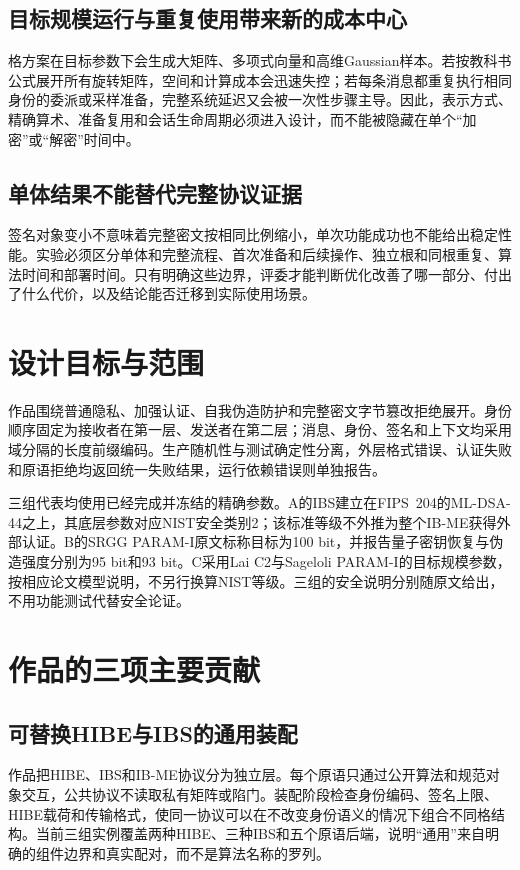\documentclass[UTF8,a4paper,12pt,oneside,openany,fontset=fandol]{ctexrep}
\begin{document}
\subsection{目标规模运行与重复使用带来新的成本中心}
格方案在目标参数下会生成大矩阵、多项式向量和高维Gaussian样本。若按教科书公式展开所有旋转矩阵，空间和计算成本会迅速失控；若每条消息都重复执行相同身份的委派或采样准备，完整系统延迟又会被一次性步骤主导。因此，表示方式、精确算术、准备复用和会话生命周期必须进入设计，而不能被隐藏在单个“加密”或“解密”时间中。

\subsection{单体结果不能替代完整协议证据}
签名对象变小不意味着完整密文按相同比例缩小，单次功能成功也不能给出稳定性能。实验必须区分单体和完整流程、首次准备和后续操作、独立根和同根重复、算法时间和部署时间。只有明确这些边界，评委才能判断优化改善了哪一部分、付出了什么代价，以及结论能否迁移到实际使用场景。

\section{设计目标与范围}
作品围绕普通隐私、加强认证、自我伪造防护和完整密文字节篡改拒绝展开。身份顺序固定为接收者在第一层、发送者在第二层；消息、身份、签名和上下文均采用域分隔的长度前缀编码。生产随机性与测试确定性分离，外层格式错误、认证失败和原语拒绝均返回统一失败结果，运行依赖错误则单独报告。

三组代表均使用已经完成并冻结的精确参数。A的IBS建立在FIPS~204的ML-DSA-44之上，其底层参数对应NIST安全类别2；该标准等级不外推为整个IB-ME获得外部认证。B的SRGG PARAM-I原文标称目标为100 bit，并报告量子密钥恢复与伪造强度分别为95 bit和93 bit。C采用Lai C2与Sageloli PARAM-I的目标规模参数，按相应论文模型说明，不另行换算NIST等级。三组的安全说明分别随原文给出，不用功能测试代替安全论证。

\section{作品的三项主要贡献}

\subsection{可替换HIBE与IBS的通用装配}
作品把HIBE、IBS和IB-ME协议分为独立层。每个原语只通过公开算法和规范对象交互，公共协议不读取私有矩阵或陷门。装配阶段检查身份编码、签名上限、HIBE载荷和传输格式，使同一协议可以在不改变身份语义的情况下组合不同格结构。当前三组实例覆盖两种HIBE、三种IBS和五个原语后端，说明“通用”来自明确的组件边界和真实配对，而不是算法名称的罗列。
\end{document}
